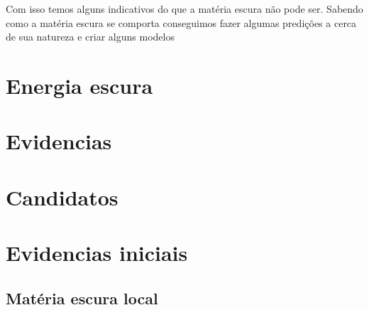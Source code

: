 \documentclass[
	article,			%
	11pt,				%
	twoside,			%
	a4paper,			%
	english,			%
	brazil,				%
	sumario=tradicional
	]{abntex2}
\begin{document}
Com isso temos alguns indicativos do que a matéria escura não pode ser. Sabendo como a matéria escura se comporta conseguimos fazer algumas predições a cerca de sua natureza e criar alguns modelos 
\section{Energia escura}

\section{Evidencias}
\section{Candidatos}



\section{Evidencias iniciais}
\subsection{Matéria escura local}
\end{document}

